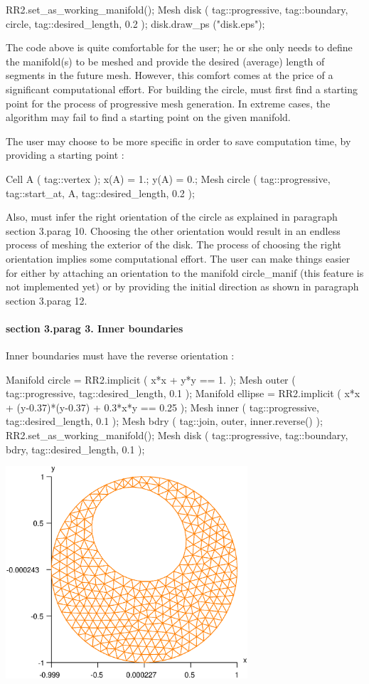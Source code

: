    RR2.set_as_working_manifold();
   Mesh disk ( tag::progressive, tag::boundary, circle, tag::desired_length, 0.2 );
   disk.draw_ps ("disk.eps");
\endverbatim

The code above is quite comfortable for the user; he or she only needs to define
the manifold(s) to be meshed and provide the desired (average) length of segments
in the future mesh.
However, this comfort comes at the price of a significant computational effort.
For building the {\codett circle}, {\ManiFEM} must first find a starting point for the process
of progressive mesh generation.
In extreme cases, the algorithm may fail to find a starting point on the given manifold.

The user may choose to be more specific in order to save computation time,
by providing a starting point :

\verbatim
   Cell A ( tag::vertex );  x(A) = 1.;  y(A) = 0.;
   Mesh circle ( tag::progressive, tag::start_at, A, tag::desired_length, 0.2 );
\endverbatim

Also, {\maniFEM} must infer the right orientation of the {\codett circle}
as explained in paragraph \numb section 3.\numb parag 10.
Choosing the other orientation would result in an endless process of meshing the exterior of
the disk.
The process of choosing the right orientation implies some computational effort.
The user can make things easier for {\maniFEM} either by attaching an orientation
to the manifold {\codett circle\_manif} (this feature is not implemented yet)
or by providing the initial direction as shown in paragraph \numb section 3.\numb parag 12.


\paragraph{\numb section 3.\numb parag 3. Inner boundaries}

Inner boundaries must have the reverse orientation :

\verbatim
   Manifold circle = RR2.implicit ( x*x + y*y == 1. );
   Mesh outer ( tag::progressive, tag::desired_length, 0.1 );
   Manifold ellipse = RR2.implicit ( x*x + (y-0.37)*(y-0.37) + 0.3*x*y == 0.25 );
   Mesh inner ( tag::progressive, tag::desired_length, 0.1 );
   Mesh bdry ( tag::join, outer, inner.reverse() );
   RR2.set_as_working_manifold();
   Mesh disk ( tag::progressive, tag::boundary, bdry, tag::desired_length, 0.1 );
   \endverbatim

\centerline{\includegraphics[width=90mm]{disk-with-hole.eps}}


